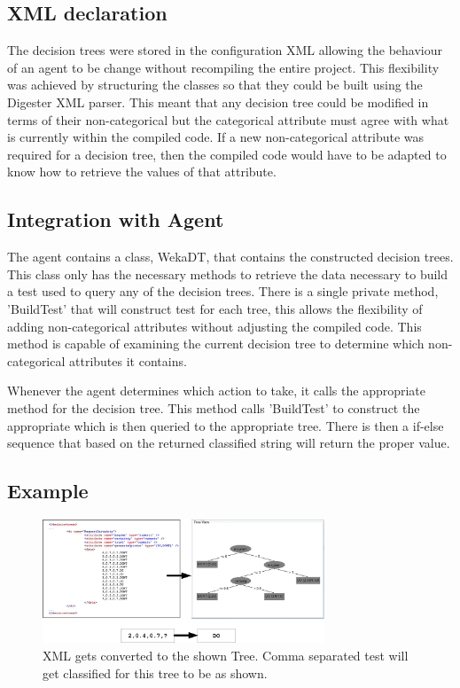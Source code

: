 \subsection{XML declaration}

The decision trees were stored in the configuration XML allowing the behaviour of an agent to be change without
recompiling the entire project.  This flexibility was achieved by structuring the classes so that 
they could be built using the Digester XML parser.  This meant that any decision tree could be modified in 
terms of their non-categorical but the categorical attribute must agree with what is currently within the 
compiled code.  If a new non-categorical attribute was required for a decision tree, then the compiled code would
have to be adapted to know how to retrieve the values of that attribute.

\subsection{Integration with Agent}

The agent contains a class, WekaDT, that contains the constructed decision trees.  This class only has
the necessary methods to retrieve the data necessary to build a test used to query any of the decision
trees.  There is a single private method, 'BuildTest' that will construct test for each tree, this allows the flexibility
of adding non-categorical attributes without adjusting the compiled code.  This method is capable of
examining the current decision tree to determine which non-categorical attributes it contains.

Whenever the agent determines which action to take, it calls the appropriate method for the decision 
tree.  This method calls 'BuildTest' to construct the appropriate which is then queried to the
appropriate tree.  There is then a if-else sequence that based on the returned classified string
will return the proper value.

\subsection{Example}

\begin{figure}
  \centering
  \caption{XML gets converted to the shown Tree.  Comma separated test will get
classified for this tree to be as shown.}
  \label{fig:xml2dt}
  \includegraphics[width=0.75\textwidth]{images/XML2DT.jpg}
\end{figure}

